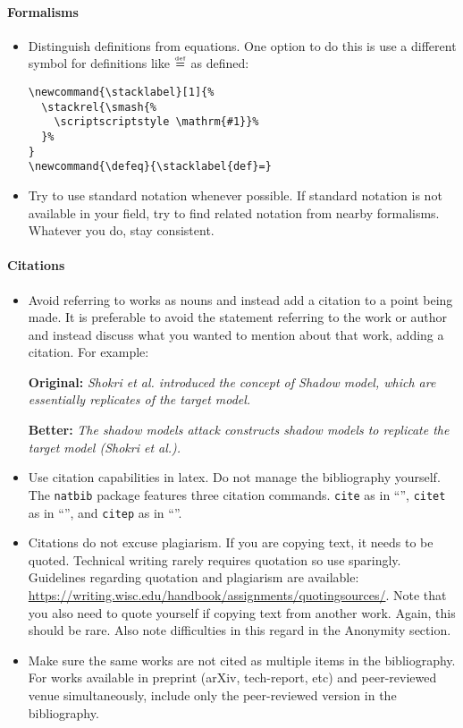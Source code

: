 \paragraph{Formalisms}
\begin{itemize}
\item{} Distinguish definitions from equations. One option to do this is use a different symbol
  for definitions like $ \defeq $ as defined:

\begin{verbatim}
\newcommand{\stacklabel}[1]{%
  \stackrel{\smash{%
    \scriptscriptstyle \mathrm{#1}}%
  }%
}
\newcommand{\defeq}{\stacklabel{def}=}
\end{verbatim}

\item{} Try to use standard notation whenever possible. If standard notation is not available in
  your field, try to find related notation from nearby formalisms. Whatever you do, stay
  consistent.
\end{itemize}

\paragraph{Citations}
\begin{itemize}
\item{} Avoid referring to works as nouns and instead add a citation to a point being made. It
  is preferable to avoid the statement referring to the work or author and instead discuss what
  you wanted to mention about that work, adding a citation. For example:

  \textbf{Original:} \textit{Shokri et al. introduced the concept of Shadow model, which are
    essentially replicates of the target model. }

  \textbf{Better:} \textit{The shadow models attack constructs shadow models to replicate the
    target model (Shokri et al.). }

\item Use citation capabilities in latex. Do not manage the bibliography yourself. The
  \texttt{natbib} package features three citation commands. \verb|cite| as in
  ``\cite{leino2018influence}'', \verb|citet| as in ``\citet{leino2018influence}'', and
  \verb|citep| as in ``\cite{leino2018influence}''.

  \item{} Citations do not excuse plagiarism. If you are copying text, it needs to be quoted.
    Technical writing rarely requires quotation so use sparingly. Guidelines regarding quotation
    and plagiarism are available:
    \url{https://writing.wisc.edu/handbook/assignments/quotingsources/}. Note that you also need to
    quote yourself if copying text from another work. Again, this should be rare. Also note
    difficulties in this regard in the Anonymity section.

  \item{} Make sure the same works are not cited as multiple items in the bibliography. For works
    available in preprint (arXiv, tech-report, etc) and peer-reviewed venue simultaneously, include
    only the peer-reviewed version in the bibliography.


\end{itemize}

